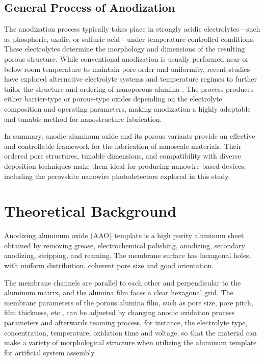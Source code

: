 \documentclass{rapportCS}
\begin{document}
	\subsection{General Process of Anodization}
	The anodization process typically takes place in strongly acidic electrolytes—such as phosphoric, oxalic, or sulfuric acid—under temperature-controlled conditions. These electrolytes determine the morphology and dimensions of the resulting porous structure. While conventional anodization is usually performed near or below room temperature to maintain pore order and uniformity, recent studies have explored alternative electrolyte systems and temperature regimes to further tailor the structure and ordering of nanoporous alumina \cite{eessaa2023review}. The process produces either barrier-type or porous-type oxides depending on the electrolyte composition and operating parameters, making anodization a highly adaptable and tunable method for nanostructure fabrication.

	In summary, anodic aluminum oxide and its porous variants provide an effective and controllable framework for the fabrication of nanoscale materials. Their ordered pore structures, tunable dimensions, and compatibility with diverse deposition techniques make them ideal for producing nanowire-based devices, including the perovskite nanowire photodetectors explored in this study.

	
	\section{Theoretical Background}
	
	Anodizing aluminum oxide (AAO) template is a high purity aluminum sheet obtained by removing grease, electrochemical polishing, anodizing, secondary anodizing, stripping, and reaming. The membrane surface has hexagonal holes, with uniform distribution, coherent pore size and good orientation\cite{lv2017research}.
	
	The membrane channels are parallel to each other and perpendicular to the aluminum matrix, and the alumina film faces a clear hexagonal grid. The membrane	parameters of the porous alumina film, such as pore size, pore pitch, film thickness, etc., can be adjusted by changing anodic oxidation process parameters and afterwards reaming process, for instance, the electrolyte type, concentration, temperature, oxidation time and voltage, so that the material can make a variety of morphological structure when utilizing the aluminum template for artificial system assembly\cite{lv2017research}.
	
\end{document}
